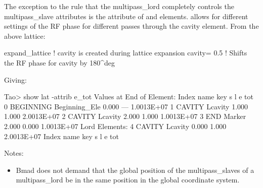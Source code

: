 \documentclass{hitec}
\begin{document}
The exception to the rule that the multipass_lord completely controls the multipass_slave attributes
is the  attribute of  and  elements. 
allows for different settings of the RF phase for different passes through the cavity element.
From the above lattice:
\begin{code}
expand_lattice                 ! cavity\2 is created during lattice expansion
cavity = 0.5 ! Shifts the RF phase for cavity\2 by 180^deg
\end{code}
Giving:
\begin{code}
Tao> show lat -attrib e_tot
      Values at End of Element:
 Index  name      key                      s       l           e
                                                             tot
     0  BEGINNING Beginning_Ele        0.000     ---  1.0013E+07
     1  CAVITY\1  Lcavity              1.000   1.000  2.0013E+07
     2  CAVITY\2  Lcavity              2.000   1.000  1.0013E+07
     3  END       Marker               2.000   0.000  1.0013E+07
Lord Elements:
     4  CAVITY    Lcavity              0.000   1.000  2.0013E+07
 Index  name      key                      s       l           e
                                                             tot
\end{code}

Notes:
\begin{itemize}
\item Bmad does not demand that the global position of the multipass_slaves of a multipass_lord be in
the same position in the global coordinate system.
\end{itemize}
\end{document}
